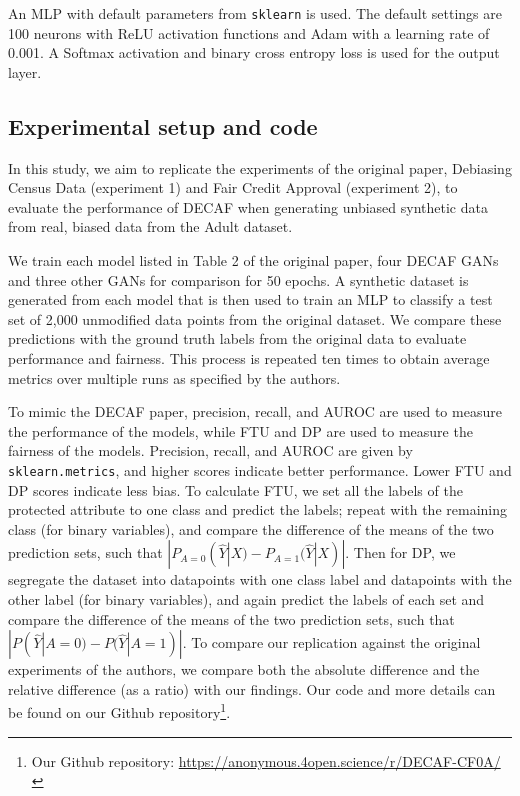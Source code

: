 An MLP with default parameters from \texttt{sklearn} is used. The default settings are 100 neurons with ReLU activation functions and Adam with a learning rate of 0.001. A Softmax activation and binary cross entropy loss is used for the output layer.

\subsection{Experimental setup and code}
\label{sec:setup}

In this study, we aim to replicate the experiments of the original paper, Debiasing Census Data (experiment 1) and Fair Credit Approval (experiment 2), to evaluate the performance of DECAF when generating unbiased synthetic data from real, biased data from the Adult dataset.

We train each model listed in Table 2 of the original paper, four DECAF GANs and three other GANs for comparison for 50 epochs. A synthetic dataset is generated from each model that is then used to train an MLP to classify a test set of 2,000 unmodified data points from the original dataset. We compare these predictions with the ground truth labels from the original data to evaluate performance and fairness. This process is repeated ten times to obtain average metrics over multiple runs as specified by the authors.

To mimic the DECAF paper, precision, recall, and AUROC are used to measure the performance of the models, while FTU and DP are used to measure the fairness of the models. Precision, recall, and AUROC are given by \texttt{sklearn.metrics}, and higher scores indicate better performance. Lower FTU and DP scores indicate less bias. To calculate FTU, we set all the labels of the protected attribute to one class and predict the labels; repeat with the remaining class (for binary variables), and compare the difference of the means of the two prediction sets, such that $|P_{A=0}(\hat{Y}|X)-P_{A=1}(\hat{Y}|X)|$. Then for DP, we segregate the dataset into datapoints with one class label and datapoints with the other label (for binary variables), and again predict the labels of each set and compare the difference of the means of the two prediction sets, such that $|P(\hat{Y}|A=0)-P(\hat{
Y}|A=1)|$. To compare our replication against the original experiments of the authors, we compare both the absolute difference and the relative difference (as a ratio) with our findings.
Our code and more details can be found on our Github repository\footnote{Our Github repository: \url{https://anonymous.4open.science/r/DECAF-CF0A/}}.

